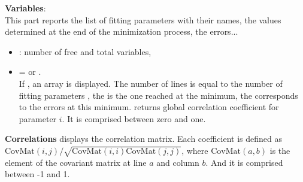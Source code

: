 \noindent \textbf{Variables}: \\
This part reports the list of fitting parameters with their
names, the values determined at the end of the minimization process,
the errors...
\begin{itemize}
\item {}: number of free and total variables,
\item {} =  or .\\
If , an array is displayed. The number of lines
is equal to the number  of fitting parameters ,
the  
is the one reached at the minimum, the  corresponds to
the errors at this minimum.   returns global correlation coefficient for
parameter $i$. It is
comprised between zero and one.
\end{itemize}

\noindent \textbf{Correlations} displays the correlation matrix. Each
coefficient is defined as\\
$\text{CovMat}(i,j)/\sqrt{\text{CovMat}(i,i)\text{CovMat}(j,j)}$,
where $\text{CovMat}(a,b)$ is the element of the covariant matrix at
line $a$ and column $b$. And it is comprised between -1 and 1.\\





